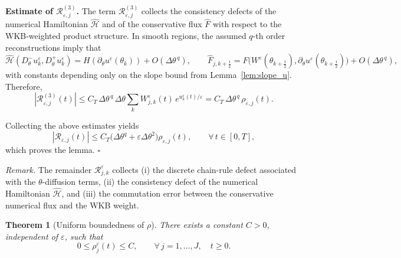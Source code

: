 \documentclass[11pt, dina4, amsfont12]{article}
\newtheorem{theorem}{Theorem}[section]
\begin{document}
\medskip
\noindent\textbf{Estimate of $\mathcal R_{\varepsilon,j}^{(3)}$.}
The term $\mathcal R_{\varepsilon,j}^{(3)}$ collects the consistency defects of
the numerical Hamiltonian $\widehat{\mathcal H}$ and of the conservative flux
$\widehat F$ with respect to the WKB-weighted product structure.
In smooth regions, the assumed $q$-th order reconstructions imply that
\[
\widehat{\mathcal H}(D_\theta^-u_k^\varepsilon,D_\theta^+u_k^\varepsilon)
=
H(\partial_\theta u^\varepsilon(\theta_k))
+O(\Delta\theta^{\,q}),
\qquad
\widehat F_{j,k+\frac12}
=
F\big(W^\varepsilon(\theta_{k+\frac12}),\partial_\theta u^\varepsilon(\theta_{k+\frac12})\big)
+O(\Delta\theta^{\,q}),
\]
with constants depending only on the slope bound from Lemma~\ref{lem:slope_u}.
Therefore,
\[
|\mathcal R_{\varepsilon,j}^{(3)}(t)|
\le
C_T\,\Delta\theta^{\,q}\,
\Delta\theta\sum_k W_{j,k}^\varepsilon(t)\,e^{u_k^\varepsilon(t)/\varepsilon}
=
C_T\,\Delta\theta^{\,q}\,\rho_{\varepsilon,j}(t).
\]

Collecting the above estimates yields
\[
|\mathcal R_{\varepsilon,j}(t)|
\le
C_T\big(\Delta\theta^q+\varepsilon\Delta\theta^2\big)\rho_{\varepsilon,j}(t),
\qquad \forall\, t\in[0,T],
\]
which proves the lemma.
\hfill$\square$


\textit{Remark.}
The remainder $\mathcal R_{j,k}^\varepsilon$ collects (i) the discrete chain-rule
defect associated with the $\theta$-diffusion terms, (ii) the consistency defect
of the numerical Hamiltonian $\widehat{\mathcal H}$, and (iii) the commutation
error between the conservative numerical flux and the WKB weight.



\begin{theorem}[Uniform boundedness of $\rho$]
There exists a constant $C>0$, independent of $\varepsilon$, such that
\[
0 \le \rho_j^\varepsilon(t) \le C,
\qquad
\forall\, j=1,\dots,J,\quad t\ge0 .
\]
\end{theorem}
\end{document}
